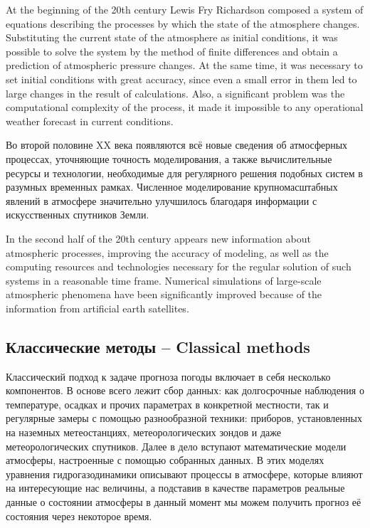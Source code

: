 \documentclass[14pt]{matmex-diploma}
\begin{document}
At the beginning of the 20th century Lewis Fry Richardson composed a system of equations describing the processes by which the state of the atmosphere changes. Substituting the current state of the atmosphere as initial conditions, it was possible to solve the system by the method of finite differences and obtain a prediction of atmospheric pressure changes\cite{lynch2008origins}. At the same time, it was necessary to set initial conditions with great accuracy, since even a small error in them led to large changes in the result of calculations. Also, a significant problem was the computational complexity of the process, it made it impossible to any operational weather forecast in current conditions.

Во второй половине XX века появляются всё новые сведения об атмосферных процессах, уточняющие точность моделирования, а также вычислительные ресурсы и технологии, необходимые для регулярного решения подобных систем в разумных временных рамках. Численное моделирование крупномасштабных явлений в атмосфере значительно улучшилось благодаря информации с искусственных спутников Земли\cite{васильев2008прогноз}.

In the second half of the 20th century appears new information about atmospheric processes, improving the accuracy of modeling, as well as the computing resources and technologies necessary for the regular solution of such systems in a reasonable time frame. Numerical simulations of large-scale atmospheric phenomena have been significantly improved because of the information from artificial earth satellites\cite{vassiliev2008prognoz}.


\subsection{Классические методы -- Classical methods}

% 

Классический подход к задаче прогноза погоды включает в себя несколько компонентов. В основе всего лежит сбор данных: как долгосрочные наблюдения о температуре, осадках и прочих параметрах в конкретной местности, так и регулярные замеры с помощью разнообразной техники: приборов, установленных на наземных метеостанциях, метеорологических зондов и даже метеорологических спутников. Далее в дело вступают математические модели атмосферы, настроенные с помощью собранных данных. В этих моделях уравнения гидрогазодинамики описывают процессы в атмосфере, которые влияют на интересующие нас величины, а подставив в качестве параметров реальные данные о состоянии атмосферы в данный момент мы можем получить прогноз её состояния через некоторое время.
\end{document}
